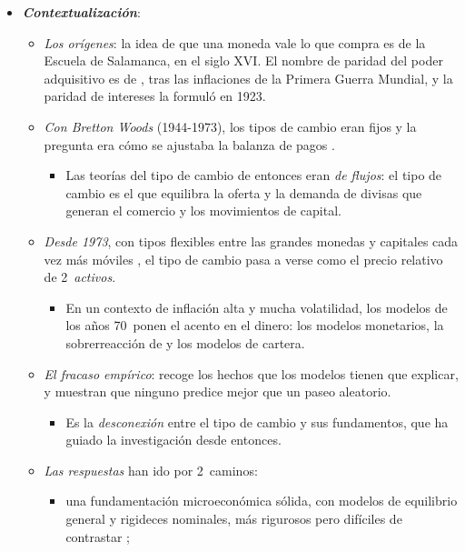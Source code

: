 \documentclass[11pt]{article}
\begin{document}
\begin{itemize}
\item \textbf{\emph{Contextualización}}:
  \begin{itemize}
  \item \emph{Los orígenes}: la idea de que una moneda vale lo que compra es de la Escuela de Salamanca, en el siglo XVI\nocite{GriceHutchinson1952School}. El nombre de paridad del poder adquisitivo es de \textcite{Cassel1918Abnormal}, tras las inflaciones de la Primera Guerra Mundial, y la paridad de intereses la formuló  en 1923\nocite{Keynes1923Tract}.
  \item \emph{Con Bretton Woods} (1944-1973), los tipos de cambio eran fijos y la pregunta era cómo se ajustaba la balanza de pagos  .
    \begin{itemize}
    \item Las teorías del tipo de cambio de entonces eran \emph{de flujos}: el tipo de cambio es el que equilibra la oferta y la demanda de divisas que generan el comercio y los movimientos de capital.
    \end{itemize}
  \item \emph{Desde 1973}, con tipos flexibles entre las grandes monedas y capitales cada vez más móviles , el tipo de cambio pasa a verse como el precio relativo de 2~\emph{activos}.
    \begin{itemize}
    \item En un contexto de inflación alta y mucha volatilidad, los modelos de los años 70~ponen el acento en el dinero: los modelos monetarios, la sobrerreacción de \textcite{Dornbusch1976Expectations} y los modelos de cartera.
    \end{itemize}
  \item \emph{El fracaso empírico}: \textcite{Mussa1979Empirical} recoge los hechos que los modelos tienen que explicar, y \textcite{MeeseRogoff1983} muestran que ninguno predice mejor que un paseo aleatorio.
    \begin{itemize}
    \item Es la \emph{desconexión} entre el tipo de cambio y sus fundamentos\nocite{ObstfeldRogoff2000Puzzles}, que ha guiado la investigación desde entonces.
    \end{itemize}
  \item \emph{Las respuestas} han ido por 2~caminos:
    \begin{itemize}
    \item una fundamentación microeconómica sólida, con modelos de equilibrio general y rigideces nominales, más rigurosos pero difíciles de contrastar ;

\end{itemize}
\end{itemize}
\end{itemize}
\end{document}
